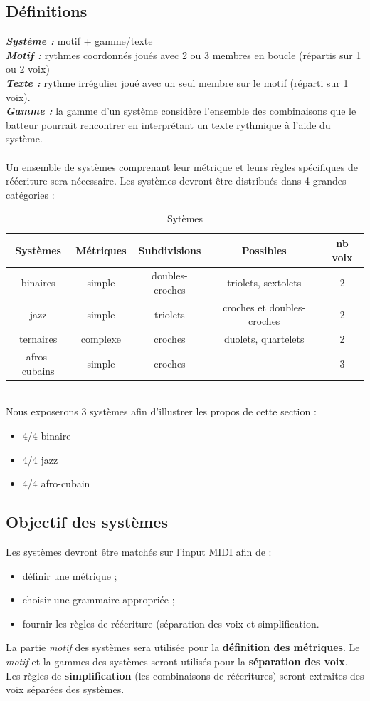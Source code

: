 \subsection*{Définitions}
\textit{\textbf{Système :}} motif + gamme/texte\\
\textit{\textbf{Motif :}} rythmes coordonnés joués avec 2 ou 3 membres en boucle (répartis sur 1 ou 2 voix)\\
\textit{\textbf{Texte :}} rythme irrégulier joué avec un seul membre sur le motif (réparti sur 1 voix).\\
\textit{\textbf{Gamme :}} la gamme d’un système considère l’ensemble des combinaisons que le batteur pourrait rencontrer en interprétant un texte rythmique à l’aide du système.\\\\
Un ensemble de systèmes comprenant leur métrique et leurs règles spécifiques de réécriture sera nécessaire. Les systèmes devront être distribués dans 4 grandes catégories :
\begin{table}[h]
	\centering
	\begin{tabular}{|c|c|c|c|c|} \hline
		Systèmes & Métriques & Subdivisions & Possibles & nb voix \\ \hline
		binaires & simple & doubles-croches & triolets, sextolets & 2 \\
		jazz & simple & triolets & croches et doubles-croches & 2 \\
		ternaires & complexe & croches & duolets, quartelets & 2 \\
		afros-cubains & simple & croches & - & 3 \\ \hline
	\end{tabular}
	\caption{Sytèmes}
\end{table}\\
Nous exposerons 3 systèmes afin d’illustrer les propos de cette section :
\begin{itemize}
	\item 4/4 binaire 
	\item 4/4 jazz
	\item 4/4 afro-cubain
\end{itemize}
\subsection*{Objectif des systèmes}
Les systèmes devront être matchés sur l’input MIDI afin de :
\begin{itemize}
	\item définir une métrique ;
	\item choisir une grammaire appropriée ;
	\item fournir les règles de réécriture (séparation des voix et simplification.\\
\end{itemize}
La partie \textit{motif} des systèmes sera utilisée pour la \textbf{définition des métriques}. Le \textit{motif} et la gammes des systèmes seront utilisés pour la \textbf{séparation des voix}. Les règles de \textbf{simplification} (les combinaisons de réécritures) seront extraites des voix séparées des systèmes.
